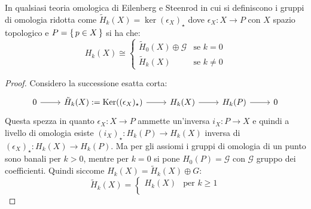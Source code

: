 \begin{proposition}
  In qualsiasi teoria omologica di Eilenberg e Steenrod in cui si definiscono i gruppi di omologia ridotta come $ \tilde{H}_k(X) = \ker{(\epsilon_X)_\star} $ dove
  $ \epsilon_X \colon X \to P $ con $ X $ spazio topologico e $ P = \set{p \in X} $ si ha che:
  \[
    H_k(X) \cong
    \begin{cases}
      \tilde{H}_0(X) \oplus \mathcal{G} & \text{se } k = 0 \\
      \tilde{H}_k(X) & \text{se } k \not= 0
    \end{cases}
  \]
\end{proposition}
\begin{proof}
  Considero la successione esatta corta:
  \[
    \begin{tikzcd}
      0 \rar & \tilde{H}_k(X) := \ker{(\epsilon_X)_\star} \rar & H_k(X) \rar & H_k(P) \rar & 0
    \end{tikzcd}
  \]
  Questa spezza in quanto $ \epsilon_X \colon X \to P $ ammette un'inversa
  $ i_X \colon P \to X $ e quindi a livello di omologia esiste
  $ (i_X)_\star \colon H_k(P) \to H_k(X) $ inversa di
  $ (\epsilon_X)_\star \colon H_k(X) \to H_k(P) $. Ma per gli assiomi i gruppi
  di omologia di un punto sono banali per $ k > 0 $, mentre
  per $ k = 0 $ si pone $ H_0(P) = \mathcal{G} $ con $ \mathcal{G} $ gruppo dei coefficienti.
  Quindi siccome $ H_k(X) = \tilde{H}_k(X) \oplus G $:
  \[
    \tilde{H}_k(X) =
    \begin{cases}
      H_k(X)               & \text{per } k \geq 1 \\

\end{cases}\]
\end{proof}
